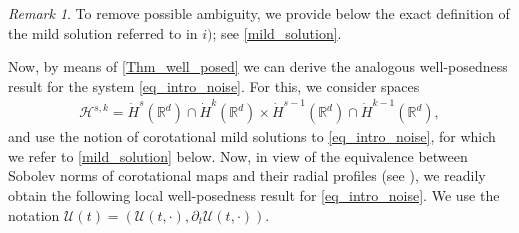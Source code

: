 \documentclass[12pt,reqno]{amsart}
\theoremstyle{plain}
\theoremstyle{remark}
\newtheorem{remark}[theorem]{Remark}
\theoremstyle{plain}
\theoremstyle{definition}
\numberwithin{equation}{section}
\numberwithin{equation}{section}
\def\R{{\mathbb R}}
\newcommand{\HH}{\mathcal{H}}
\begin{document}
	\begin{remark}
		To remove possible ambiguity, we provide below the exact definition of the mild solution referred to in $i)$; see \autoref{mild_solution}.
	\end{remark}
	\noindent 
	\noindent Now, by means of \autoref{Thm_well_posed} we can derive the analogous well-posedness result for the system \eqref{eq_intro_noise}. For this, we consider spaces
	\begin{align*}
	    \HH^{s,k}=\dot{H}^s(\R^d)\cap \dot{H}^k(\R^d)\times \dot{H}^{s-1}(\R^d)\cap \dot{H}^{k-1}(\R^d),
	\end{align*}
	and use the notion of corotational mild solutions to \eqref{eq_intro_noise}, for which we refer to \autoref{mild_solution} below.
	Now, in view of the equivalence between Sobolev norms of corotational maps and their radial profiles (see \cite[Proposition A.5, Remark A.6]{glogic2022stable}), we readily obtain the following local well-posedness result for \eqref{eq_intro_noise}. We use the notation $\boldsymbol{\mathcal{U}}(t)=(\mathcal{U}(t,\cdot),\partial_t \mathcal{U}(t,\cdot))$.
\end{document}
